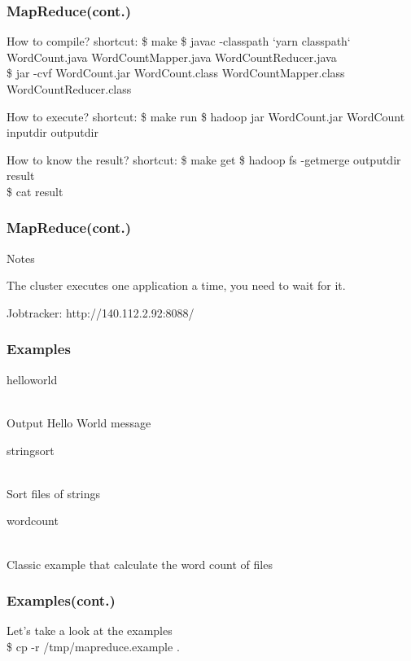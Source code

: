 \documentclass[12pt]{beamer}
\begin{document}
\begin{frame}
  \frametitle{MapReduce(cont.)}
  \begin{block}{How to compile? shortcut: \$ make}
    \$ javac -classpath `yarn classpath` WordCount.java WordCountMapper.java WordCountReducer.java\\
    \$ jar -cvf WordCount.jar WordCount.class WordCountMapper.class WordCountReducer.class\\
  \end{block}

  \begin{block}{How to execute? shortcut: \$ make run}
    \$ hadoop jar WordCount.jar WordCount inputdir outputdir
  \end{block}

  \begin{block}{How to know the result? shortcut: \$ make get}
    \$ hadoop fs -getmerge outputdir result\\
    \$ cat result
  \end{block}
\end{frame}

\begin{frame}
  \frametitle{MapReduce(cont.)}
  Notes
  \begin{itemize}
    {\item The cluster executes one application a time, you need to wait for it.}
    {\item Jobtracker: http://140.112.2.92:8088/}
  \end{itemize}
\end{frame}


\begin{frame}
  \frametitle{Examples}
  \begin{itemize}
    {\item helloworld}\\
      Output Hello World message
    {\item stringsort}\\
      Sort files of strings
    {\item wordcount}\\
      Classic example that calculate the word count of files
  \end{itemize}
\end{frame}

\begin{frame}
  \frametitle{Examples(cont.)}
  \begin{center}
    {\Large Let's take a look at the examples}\\
    {\Large \$ cp -r /tmp/mapreduce.example .}
  \end{center}
\end{frame}
\end{document}
